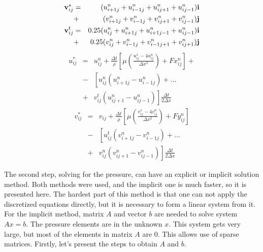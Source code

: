 \documentclass[journal]{IEEEtran}
\begin{document}
\begin{eqnarray}
\textbf{v}_{ij}^s&=&(\SumFour{u})\textbf{i} \nonumber \\&+& (\SumFour{v})\textbf{j} \label{step1-1}\\
\textbf{v}_{ij}^t&=&0.25(u_{ij}^n+u_{i+1j}^n+u_{i+1j-1}^n+u_{ij-1}^n)\textbf{i} \nonumber \\ &+& 0.25(v_{ij}^n+v_{i-1j}^n+v_{i-1j+1}^n+v_{ij+1}^n)\textbf{j} \label{step1-2}
\end{eqnarray}
\begin{eqnarray}
u_{ij}^{*}&=&u_{ij}^n+\frac{\Delta t}{\rho}\left[\mu\left(\frac{u_{ij}^s-4u_{ij}^n}{\Delta
x^2}\right)+Fx_{ij}^n\right] + \nonumber \\
&-&\left[u_{ij}^n(u_{i+1j}^n-u_{i-1j}^n)+\ldots \right.\nonumber \\
&+& \left. v_{ij}^t(u_{ij+1}^n-u_{ij-1}^n)\right]\frac{\Delta t}{2\Delta x}\label{step1-3}
\end{eqnarray}
\begin{eqnarray}
v_{ij}^{*}&=&v_{ij}+\frac{\Delta t}{\rho}\left[\mu\left(\frac{v_{ij}^s-4v_{ij}^n}{\Delta
x^2}\right)+Fy_{ij}^n\right] \nonumber \\
&-&\left[u_{ij}^t (v_{i+1j}^n-v_{i-1j}^n)+\ldots \right.\nonumber \\
&+& \left. v_{ij}^n(v_{ij+1}^n-v_{ij-1}^n)\right]\frac{\Delta t}{2\Delta x}\label{step1-4}
\end{eqnarray}


The second step, solving for the pressure, can have an explicit or implicit solution method. Both methods were used, and the implicit one is much faster, so it is presented here. The hardest part of this method is that one can not apply the discretized equations directly, but it is necessary to form a linear system from it. For the implicit method, matrix $A$ and vector $b$ are needed to solve system $Ax = b$. The pressure elements are in the unknown $x$. This system gets very large, but most of the elements in matrix $A$ are 0. This allows use of sparse matrices. Firstly, let's present the steps to obtain $A$ and $b$.
\end{document}
